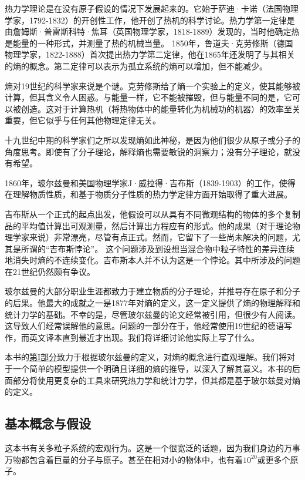 \documentclass[UTF8]{ctexart}
\numberwithin{equation}{section}%
\numberwithin{figure}{section}%
\begin{document}
    热力学理论是在没有原子假设的情况下发展起来的。它始于萨迪·卡诺（法国物理学家，1792-1832）的开创性工作，他开创了热机的科学讨论。热力学第一定律是由詹姆斯·普雷斯科特·焦耳（英国物理学家，1818-1889）发现的，当时他确定热是能量的一种形式，并测量了热的机械当量。
    1850年，鲁道夫·克劳修斯（德国物理学家，1822-1888）首次提出热力学第二定律，他在1865年还发明了与其相关的熵的概念。第二定律可以表示为孤立系统的熵可以增加，但不能减少。

    熵对19世纪的科学家来说是个谜。克劳修斯给了熵一个实验上的定义，使其能够被计算，但其含义令人困惑。与能量一样，它不能被摧毁，但与能量不同的是，它可以被创造。这对于计算热机（将热物体中的能量转化为机械功的机器）的效率至关重要，但它似乎与任何其他物理定律无关。

    十九世纪中期的科学家们之所以发现熵如此神秘，是因为他们很少从原子或分子的角度思考。即使有了分子理论，解释熵也需要敏锐的洞察力；没有分子理论，就没有希望。

    1860年，玻尔兹曼和美国物理学家J·威拉得·吉布斯（1839-1903）的工作，使得在理解物质性质，和基于物质分子性质的热力学定律方面开始取得了重大进展。

    吉布斯从一个正式的起点出发，他假设可以从具有不同微观结构的物体的多个复制品的平均值计算出可观测量，然后计算出方程应有的形式。他的成果（对于理论物理学家来说）非常漂亮，尽管有点正式。然而，它留下了一些尚未解决的问题，尤其是所谓的“吉布斯悖论”。
    这个问题涉及到设想当混合物中粒子特性的差异连续地消失时熵的不连续变化。吉布斯本人并不认为这是一个悖论。其中所涉及的问题在21世纪仍然颇有争议。

    玻尔兹曼的大部分职业生涯都致力于建立物质的分子理论，并推导存在原子和分子的后果。他最大的成就之一是1877年对熵的定义，这一定义提供了熵的物理解释和统计力学的基础。不幸的是，尽管玻尔兹曼的论文经常被引用，但很少有人阅读。
    这导致人们经常误解他的意思。问题的一部分在于，他经常使用19世纪的德语写作，而英文译本直到最近才出现。我们将详细讨论他实际上写了什么。

    本书的\hyperref[part1]{第I部分}致力于根据玻尔兹曼的定义，对熵的概念进行直观理解。我们将对于一个简单的模型提供一个明确且详细的熵的推导，以深入了解其意义。本书的后面部分将使用更复杂的工具来研究热力学和统计力学，但其都是基于玻尔兹曼对熵的定义。

    \subsection{基本概念与假设}
    这本书有关多粒子系统的宏观行为。这是一个很宽泛的话题，因为我们身边的万事万物都包含着巨量的分子与原子。甚至在相对小的物体中，也有着$10^{20}$或更多个原子。
\end{document}
